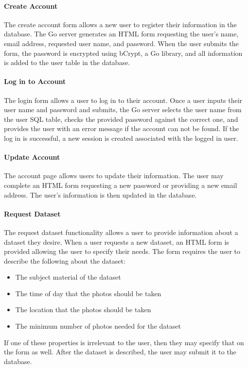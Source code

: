 \documentclass{article}
\begin{document}
\paragraph{Create Account}
The create account form allows a new user to register their information in the
database. The Go server generates an HTML form requesting the user's name,
email address, requested user name, and password. When the user submits the
form, the password is encrypted using bCrypt, a Go library, and all information
is added to the user table in the database.

\paragraph{Log in to Account}
The login form allows a user to log in to their account. Once a user inputs
their user name and password and submits, the Go server selects the user name
from the user SQL table, checks the provided password against the correct one,
and provides the user with an error message if the account can not be found. If
the log in is successful, a new session is created associated with the logged
in user.

\paragraph{Update Account}
The account page allows users to update their information. The user may
complete an HTML form requesting a new password or providing a new email
address. The user's information is then updated in the database.

\paragraph{Request Dataset}
The request dataset functionality allows a user to provide information about a
dataset they desire. When a user requests a new dataset, an HTML form is
provided allowing the user to specify their needs. The form requires the user
to describe the following about the dataset:
\begin{itemize}
  \item The subject material of the dataset
  \item The time of day that the photos should be taken
  \item The location that the photos should be taken
  \item The minimum number of photos needed for the dataset
\end{itemize}
If one of these properties is irrelevant to the user, then they may specify
that on the form as well. After the dataset is described, the user may submit
it to the database.
\end{document}
